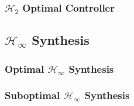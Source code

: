 \subsubsection{\texorpdfstring{$\mathcal{H}_2$}{H2} Optimal Controller}

\subsection{\texorpdfstring{$\mathcal{H}_\infty$}{H-infinity} Synthesis}

\subsubsection{Optimal \texorpdfstring{$\mathcal{H}_\infty$}{H-infinity} Synthesis}

\subsubsection{Suboptimal \texorpdfstring{$\mathcal{H}_\infty$}{H-infinity} Synthesis}

